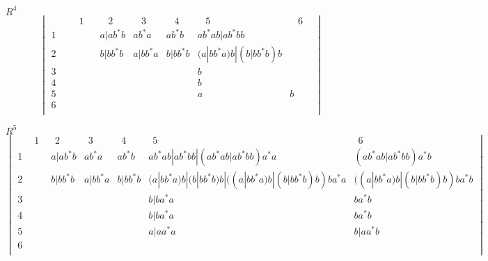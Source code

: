 \documentclass[a4paper,12pt]{article} %
\begin{document}
$R^4$\\

\[\begin{vmatrix}
\hspace{15pt}&\hspace{10pt}1\hspace{10pt}&\hspace{10pt}2\hspace{10pt}&\hspace{10pt}3\hspace{10pt}&\hspace{10pt}4\hspace{10pt}&\hspace{10pt}5\hspace{10pt}&\hspace{10pt}6\hspace{10pt}\\
1& & a|ab^*b & ab^*a & ab^*b & ab^*ab|ab^*bb\\
2& & b|bb^*b & a|bb^*a & b|bb^*b & (a|bb^*a)b|(b|bb^*b)b\\
3& & & & & b\\
4& & & & & b\\
5& & & & & a & b\\
6& \\
\end{vmatrix}
\]


$R^5$\\

\[\begin{vmatrix}
\hspace{5pt}&\hspace{5pt}1\hspace{5pt}&\hspace{5pt}2\hspace{5pt}&\hspace{5pt}3\hspace{5pt}&\hspace{5pt}4\hspace{5pt}&\hspace{5pt}5\hspace{5pt}&\hspace{5pt}6\hspace{5pt}\\
1& & a|ab^*b & ab^*a & ab^*b & ab^*ab|ab^*bb|(ab^*ab|ab^*bb)a^*a & (ab^*ab|ab^*bb)a^*b\\
2& & b|bb^*b & a|bb^*a & b|bb^*b & (a|bb^*a)b|(b|bb^*b)b|((a|bb^*a)b|(b|bb^*b)b)ba^*a & ((a|bb^*a)b|(b|bb^*b)b)ba^*b\\
3& & & & & b|ba^*a & ba^*b\\
4& & & & & b|ba^*a & ba^*b\\
5& & & & & a|aa^*a & b|aa^*b\\
6& \\
\end{vmatrix}
\]
\end{document}
